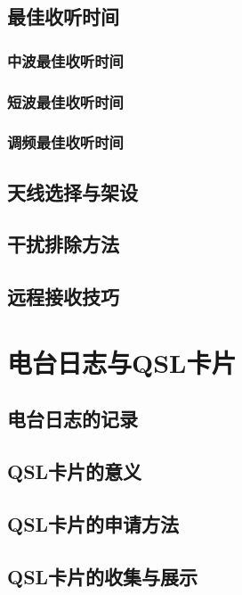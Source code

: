 \documentclass[12pt,UTF8]{ctexbook}
\begin{document}
\section{最佳收听时间}

\subsection{中波最佳收听时间}

\subsection{短波最佳收听时间}

\subsection{调频最佳收听时间}

\section{天线选择与架设}

\section{干扰排除方法}

\section{远程接收技巧}

\chapter{电台日志与QSL卡片}

\section{电台日志的记录}

\section{QSL卡片的意义}

\section{QSL卡片的申请方法}

\section{QSL卡片的收集与展示}
\end{document}
